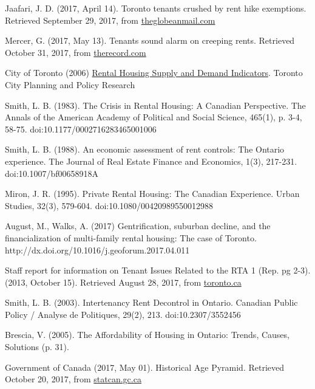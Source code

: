 \begin{thebibliography}{9}
  Jaafari, J. D. (2017, April 14). Toronto tenants crushed by rent hike exemptions. Retrieved September 29, 2017, from \href{https://beta.theglobeandmail.com/news/toronto/toronto-tenants-crushed-by-rent-hike-exemptions/article33806825/}{theglobeanmail.com}

  Mercer, G. (2017, May 13). Tenants sound alarm on creeping rents. Retrieved October 31, 2017, from \href{https://www.therecord.com/news-story/7312772-tenants-sound-alarm-on-creeping-rents/}{therecord.com}

  City of Toronto (2006) \href{https://www1.toronto.ca/city_of_toronto/social_development_finance__administration/files/pdf/housing_rental.pdf}{Rental Housing Supply and Demand Indicators}. Toronto City Planning and Policy Research

 Smith, L. B. (1983). The Crisis in Rental Housing: A Canadian Perspective. The Annals of the American Academy of Political and Social Science, 465(1), p. 3-4, 58-75. doi:10.1177/0002716283465001006

  Smith, L. B. (1988). An economic assessment of rent controls: The Ontario experience. The Journal of Real Estate Finance and Economics, 1(3), 217-231. doi:10.1007/bf00658918A

 Miron, J. R. (1995). Private Rental Housing: The Canadian Experience. Urban Studies, 32(3), 579-604. doi:10.1080/00420989550012988

  August, M., Walks, A. (2017) Gentrification, suburban decline, and the financialization of multi-family rental housing: The case of Toronto. http://dx.doi.org/10.1016/j.geoforum.2017.04.011

  Staff report for information on Tenant Issues Related to the RTA 1 (Rep. pg 2-3). (2013, October 15). Retrieved August 28, 2017, from \href{http://www.toronto.ca/legdocs/mmis/2013/ex/bgrd/backgroundfile-63467.pdf}{toronto.ca}

 Smith, L. B. (2003). Intertenancy Rent Decontrol in Ontario. Canadian Public Policy / Analyse de Politiques, 29(2), 213. doi:10.2307/3552456

 Brescia, V. (2005). The Affordability of Housing in Ontario: Trends, Causes, Solutions (p. 31).

  Government of Canada (2017, May 01). Historical Age Pyramid. Retrieved October 20, 2017, from \href{http://www12.statcan.gc.ca/census-recensement/2016/dp-pd/pyramid/pyramid.cfm?geo1=35\&type=1}{statcan.gc.ca}


\end{thebibliography}
